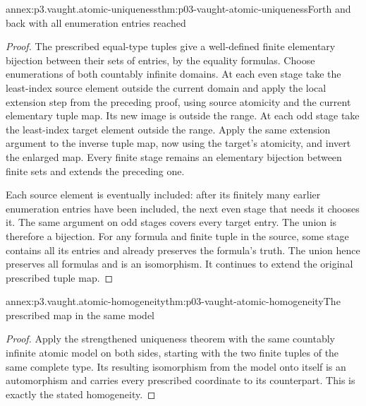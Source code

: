 \begin{annexitem}{annex:p3.vaught.atomic-uniqueness}{thm:p03-vaught-atomic-uniqueness}{Forth and back with all enumeration entries reached}
\begin{proof}
The prescribed equal-type tuples give a well-defined finite elementary
bijection between their sets of entries, by the equality formulas.
Choose enumerations of both countably infinite domains.
At each even stage take the least-index source element outside the
current domain and apply the local extension step from the preceding
proof, using source atomicity and the current elementary tuple map.
Its new image is outside the range.
At each odd stage take the least-index target element outside the
range. Apply the same extension argument to the inverse tuple map,
now using the target's atomicity, and invert the enlarged map.
Every finite stage remains an elementary bijection between finite
sets and extends the preceding one.

Each source element is eventually included: after its finitely many
earlier enumeration entries have been included, the next even stage
that needs it chooses it. The same argument on odd stages covers
every target entry. The union is therefore a bijection.
For any formula and finite tuple in the source, some stage contains
all its entries and already preserves the formula's truth.
The union hence preserves all formulas and is an isomorphism.
It continues to extend the original prescribed tuple map.
\end{proof}
\end{annexitem}

\begin{annexitem}{annex:p3.vaught.atomic-homogeneity}{thm:p03-vaught-atomic-homogeneity}{The prescribed map in the same model}
\begin{proof}
Apply the strengthened uniqueness theorem with the same countably
infinite atomic model on both sides, starting with the two finite
tuples of the same complete type. Its resulting isomorphism from
the model onto itself is an automorphism and carries every prescribed
coordinate to its counterpart. This is exactly the stated homogeneity.
\end{proof}
\end{annexitem}

